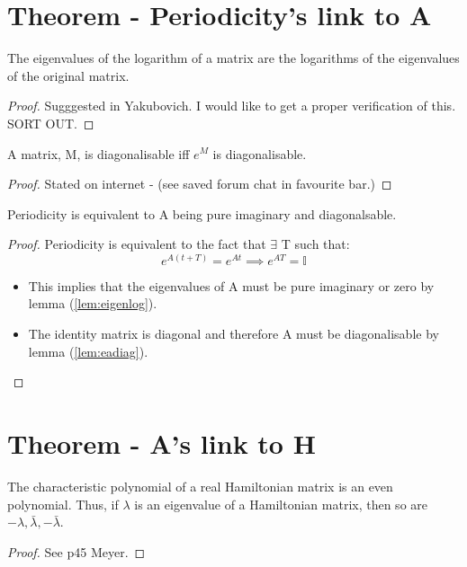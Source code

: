 
\section{Theorem - Periodicity's link to A}
\begin{lemma} The eigenvalues of the logarithm of a matrix are the logarithms of the eigenvalues of the original matrix. \label{lem:eigenlog} \end{lemma} 
\begin{proof}
Sugggested in Yakubovich. I would like to get a proper verification of this. SORT OUT.
\end{proof}

\begin{lemma} A matrix, M, is diagonalisable iff $e^M$ is diagonalisable. \label{lem:eadiag} \end{lemma} 
\begin{proof}
Stated on internet - (see saved forum chat in favourite bar.)
\end{proof}

\begin{theorem} Periodicity is equivalent to A being pure imaginary and diagonalsable. \label{lem:periodicity} \end{theorem}
\begin{proof}
Periodicity is equivalent to the fact that $\exists$ T such that:
\begin{equation}
e^{A(t+T)}=e^{At} \implies e^{AT}=\mathbb{I}
\end{equation}
\begin{itemize}
\item This implies that the eigenvalues of A must be pure imaginary or zero by lemma (\ref{lem:eigenlog}). 
\item The identity matrix is diagonal and therefore A must be diagonalisable by lemma (\ref{lem:eadiag}).
\end{itemize}
\end{proof}


\section{Theorem - A's link to H}
\begin{lemma} The characteristic polynomial of a real Hamiltonian matrix is an even polynomial. Thus, if $\lambda$ is an eigenvalue of a Hamiltonian matrix, then so are $-\lambda, \bar{\lambda}, -\bar{\lambda}$. \label{lem:hamevalues} \end{lemma}
\begin{proof}
See p45 Meyer. 
\end{proof}

